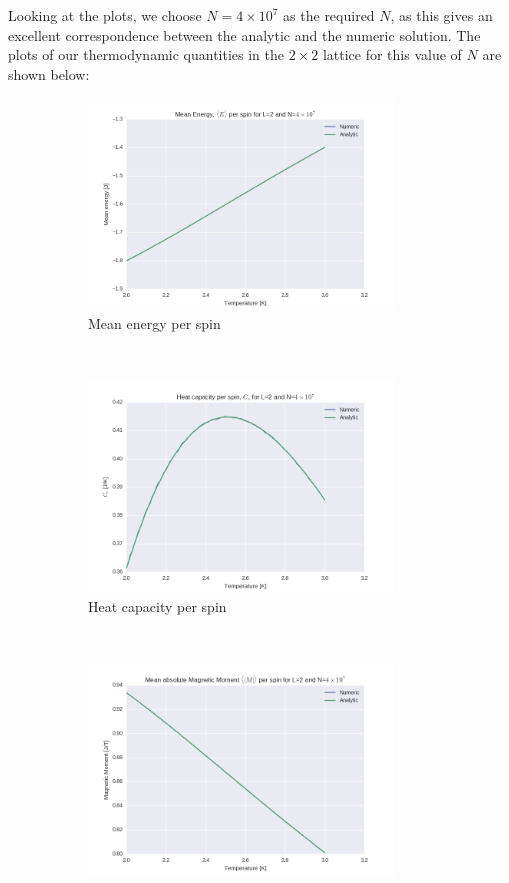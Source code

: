 \documentclass[a4paper, 10pt]{article}
\begin{document}
Looking at the plots, we choose $N=4\times 10^7$ as the required $N$, as this gives an excellent correspondence between the analytic and the numeric solution. The plots of our thermodynamic quantities in the $2\times 2$ lattice for this value of $N$ are shown below:
\begin{figure}[!ht]
    \centering
    \begin{subfigure}[H!]{0.5\textwidth}
        \centering
        \includegraphics[height=2.2in]{L2MeanEner4e7.png}
        \caption{Mean energy per spin}
    \end{subfigure}%
    ~ 
    \begin{subfigure}[H!]{0.5\textwidth}
        \centering
        \includegraphics[height=2.2in]{L2Cv4e7.png}
        \caption{Heat capacity per spin}
    \end{subfigure}
    ~
     \begin{subfigure}[H!]{0.5\textwidth}
        \centering
        \includegraphics[height=2.2in]{L2MeanabsMag4e7.png}

\end{subfigure}
\end{figure}
\end{document}
